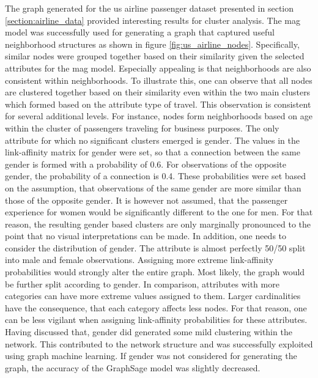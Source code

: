   The graph generated for the \acs{us} airline passenger dataset presented in 
  section \ref{section:airline_data} provided interesting results for cluster 
  analysis. The \acs{mag} model was successfully used for generating a graph that 
  captured useful neighborhood structures as shown in figure \ref{fig:us_airline_nodes}. 
  Specifically, similar nodes were grouped together based on their similarity 
  given the selected attributes for the \acs{mag} model. Especially appealing is 
  that neighborhoods are also consistent within neighborhoods. To illustrate this, 
  one can observe that all nodes are clustered together based on their 
  similarity even within the two main clusters which formed based on the 
  attribute type of travel. This observation is consistent for several 
  additional levels. For instance, nodes form neighborhoods based on age within 
  the cluster of passengers traveling for business purposes. The only attribute 
  for which no significant clusters emerged is gender. The values in the 
  link-affinity matrix for gender were set, so that a connection between the
  same gender is formed with a probability of 0.6. For observations of the
  opposite gender, the probability of a connection is 0.4. These probabilities 
  were set based on the assumption, that observations of the same gender are 
  more similar than those of the opposite gender. It is however not assumed, 
  that the passenger experience for women would be significantly different to 
  the one for men. For that reason, the resulting gender based clusters are
  only marginally pronounced to the point that no visual interpretations can be
  made. In addition, one needs to consider the distribution of gender. The 
  attribute is almost perfectly 50/50 split into male and female observations. 
  Assigning more extreme link-affinity probabilities would strongly 
  alter the entire graph. Most likely, the graph would be further split according to
  gender. In comparison, attributes with more categories can have more extreme
  values assigned to them. Larger cardinalities have the consequence, that each
  category affects less nodes. For that reason, one can be less vigilant when
  assigning link-affinity probabilities for these attributes. Having discussed
  that, gender did generated some mild clustering within the network. This 
  contributed to the network structure and was successfully exploited using 
  graph machine learning. If gender was not considered for generating the graph, 
  the accuracy of the GraphSage model was slightly decreased. \\

